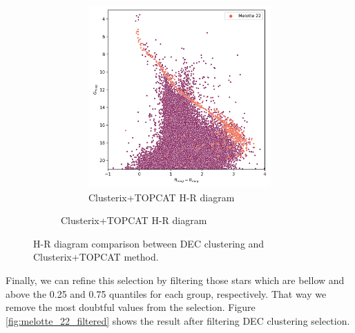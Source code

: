 \documentclass[11pt, a4paper, english]{book}
\begin{document}
\begin{figure}[htbp]
\begin{subfigure}{0.9\textwidth}
\begin{subfigure}[t]{0.45\textwidth}
      \includegraphics[width=\textwidth]{../figures/melotte_22/hr_diagram_melotte_22.png}
      \caption{Clusterix+TOPCAT H-R diagram}
    \end{subfigure}
  \end{subfigure}
  \caption{H-R diagram comparison between DEC clustering and Clusterix+TOPCAT method.}
  \label{fig:hr_diagram_comparison}
\end{figure}

Finally, we can refine this selection by filtering those stars which are bellow and above the 0.25 and 0.75 quantiles for each group, respectively.
That way we remove the most doubtful values from the selection.
Figure \ref{fig:melotte_22_filtered} shows the result after filtering DEC clustering selection.
\end{document}
